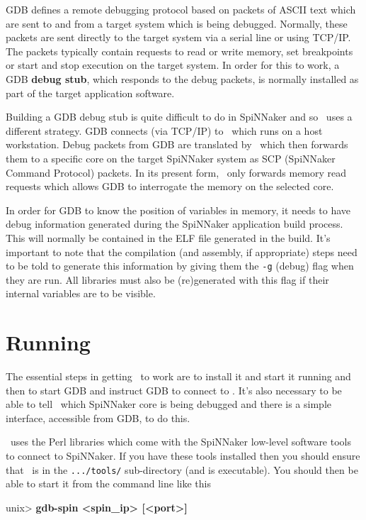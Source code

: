 GDB defines a remote debugging protocol based on packets of ASCII text
which are sent to and from a target system which is being
debugged. Normally, these packets are sent directly to the target
system via a serial line or using TCP/IP. The packets typically
contain requests to read or write memory, set breakpoints or start and
stop execution on the target system. In order for this to work, a
GDB \textbf{debug stub}, which responds to the debug packets, is
normally installed as part of the target application software.

Building a GDB debug stub is quite difficult to do in SpiNNaker and
so \gdbspin\ uses a different strategy. GDB connects (via TCP/IP)
to \gdbspin\ which runs on a host workstation. Debug packets from GDB
are translated by \gdbspin\ which then forwards them to a specific
core on the target SpiNNaker system as SCP (SpiNNaker Command
Protocol) packets. In its present form, \gdbspin\ only forwards memory
read requests which allows GDB to interrogate the memory on the
selected core.

In order for GDB to know the position of variables in memory, it needs
to have debug information generated during the SpiNNaker application
build process. This will normally be contained in the ELF file
generated in the build. It's important to note that the compilation
(and assembly, if appropriate) steps need to be told to generate this
information by giving them the \texttt{-g} (debug) flag when they are
run. All libraries must also be (re)generated with this flag if their
internal variables are to be visible.

\section{Running \gdbspin}

The essential steps in getting \gdbspin\ to work are to install it and
start it running and then to start GDB and instruct GDB to connect
to \gdbspin. It's also necessary to be able to tell \gdbspin\ which
SpiNNaker core is being debugged and there is a simple interface,
accessible from GDB, to do this.

\gdbspin\ uses the Perl libraries which come with the SpiNNaker
low-level software tools to connect to SpiNNaker. If you have these
tools installed then you should ensure that \gdbspin\ is in
the \texttt{.../tools/} sub-directory (and is executable). You should
then be able to start it from the command line like this

\begin{shell}
unix> \textbf{gdb-spin <spin\_ip> [<port>]}
\end{shell}


